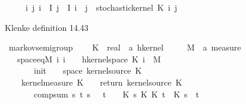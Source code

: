 \begin{isabellebody}
\ \ \ \ \ {\isachardoublequoteopen}{\isasymAnd}i\ j{\isachardot}{\kern0pt}\ {\isasymlbrakk}i\ {\isasymin}\ I{\isacharsemicolon}{\kern0pt}\ j\ {\isasymin}\ I{\isacharsemicolon}{\kern0pt}\ i\ {\isacharless}{\kern0pt}\ j{\isasymrbrakk}\ {\isasymLongrightarrow}\ stochastic{\isacharunderscore}{\kern0pt}kernel\ {\isacharparenleft}{\kern0pt}K\ i\ j{\isacharparenright}{\kern0pt}{\isachardoublequoteclose}%
\begin{isamarkuptext}%
Klenke definition 14.43%
\end{isamarkuptext}\isamarkuptrue%
\isamarkupfalse%
\ markov{\isacharunderscore}{\kern0pt}semigroup\ {\isacharequal}{\kern0pt}\isanewline
\ \ \ K\ {\isacharcolon}{\kern0pt}{\isacharcolon}{\kern0pt}\ {\isachardoublequoteopen}real\ {\isasymRightarrow}\ {\isacharprime}{\kern0pt}a\ hkernel{\isachardoublequoteclose}\isanewline
\ \ \ \ \ M\ {\isacharcolon}{\kern0pt}{\isacharcolon}{\kern0pt}\ {\isachardoublequoteopen}{\isacharprime}{\kern0pt}a\ measure{\isachardoublequoteclose}\isanewline
\ \ \ space{\isacharunderscore}{\kern0pt}eq{\isacharunderscore}{\kern0pt}M{\isacharcolon}{\kern0pt}\ {\isachardoublequoteopen}{\isasymAnd}i{\isachardot}{\kern0pt}\ i\ {\isasymge}\ {}\ {\isasymLongrightarrow}\ hkernel{\isacharunderscore}{\kern0pt}space\ {\isacharparenleft}{\kern0pt}K\ i{\isacharparenright}{\kern0pt}\ {\isacharequal}{\kern0pt}\ M{\isachardoublequoteclose}\isanewline
\ \ \ \ \ \ \ init{\isacharcolon}{\kern0pt}\ {\isachardoublequoteopen}{\isasymAnd}{\isasymomega}{\isachardot}{\kern0pt}\ {\isasymomega}\ {\isasymin}\ space\ {\isacharparenleft}{\kern0pt}kernel{\isacharunderscore}{\kern0pt}source\ {\isacharparenleft}{\kern0pt}K\ {}{\isacharparenright}{\kern0pt}{\isacharparenright}{\kern0pt}\isanewline
\ \ \ {\isasymLongrightarrow}\ kernel{\isacharunderscore}{\kern0pt}measure\ {\isacharparenleft}{\kern0pt}K\ {}{\isacharparenright}{\kern0pt}\ {\isasymomega}\ {\isacharequal}{\kern0pt}\ return\ {\isacharparenleft}{\kern0pt}kernel{\isacharunderscore}{\kern0pt}source\ {\isacharparenleft}{\kern0pt}K\ {}{\isacharparenright}{\kern0pt}{\isacharparenright}{\kern0pt}\ {\isasymomega}{\isachardoublequoteclose}\isanewline
\ \ \ \ \ \ \ comp{\isacharunderscore}{\kern0pt}sum{\isacharcolon}{\kern0pt}\ {\isachardoublequoteopen}{\isasymAnd}s\ t{\isachardot}{\kern0pt}\ {\isasymlbrakk}s\ {\isasymge}\ {}{\isacharsemicolon}{\kern0pt}\ t\ {\isasymge}\ {}{\isasymrbrakk}\ {\isasymLongrightarrow}\ K\ s\ {\isasymcirc}\isactrlsub K\ K\ t\ {\isacharequal}{\kern0pt}\ K\ {\isacharparenleft}{\kern0pt}s\ {\isacharplus}{\kern0pt}\ t{\isacharparenright}{\kern0pt}{\isachardoublequoteclose}\isanewline

\end{isabellebody}
